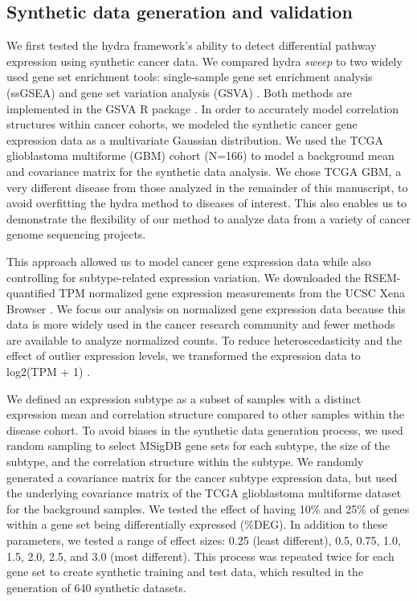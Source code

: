 \documentclass[10pt,letterpaper]{article}
\begin{document}
\subsection*{Synthetic data generation and validation}
We first tested the hydra framework’s ability to detect differential pathway expression using synthetic cancer data. We compared hydra \textit{sweep} to two widely used gene set enrichment tools: single-sample gene set enrichment analysis (ssGSEA) and gene set variation analysis (GSVA) \cite{barbieSystematicRNAInterference2009, hanzelmannGSVAGeneSet2013, tarcaComparisonGeneSet2013}. Both methods are implemented in the GSVA R package \cite{hanzelmannGSVAGeneSet2013}. In order to accurately model correlation structures within cancer cohorts, we modeled the synthetic cancer gene expression data as a multivariate Gaussian distribution. We used the TCGA glioblastoma multiforme (GBM) cohort (N=166) to model a background mean and covariance matrix for the synthetic data analysis. We chose TCGA GBM, a very different disease from those analyzed in the remainder of this manuscript, to avoid overfitting the hydra method to diseases of interest. This also enables us to demonstrate the flexibility of our method to analyze data from a variety of cancer genome sequencing projects.

This approach allowed us to model cancer gene expression data while also controlling for subtype-related expression variation. We downloaded the RSEM-quantified TPM normalized gene expression measurements from the UCSC Xena Browser \cite{goldmanUCSCXenaPlatform2018}. We focus our analysis on normalized gene expression data because this data is more widely used in the cancer research community and fewer methods are available to analyze normalized counts. To reduce heteroscedasticity and the effect of outlier expression levels, we transformed the expression data to log2(TPM + 1) \cite{zwienerTransformingRNASeqData2014}.

We defined an expression subtype as a subset of samples with a distinct expression mean and correlation structure compared to other samples within the disease cohort. To avoid biases in the synthetic data generation process, we used random sampling to select MSigDB gene sets for each subtype, the size of the subtype, and the correlation structure within the subtype. We randomly generated a covariance matrix for the cancer subtype expression data, but used the underlying covariance matrix of the TCGA glioblastoma multiforme dataset for the background samples. We tested the effect of having 10\% and 25\% of genes within a gene set being differentially expressed (\%DEG). In addition to these parameters, we tested a range of effect sizes: 0.25 (least different), 0.5, 0.75, 1.0, 1.5, 2.0, 2.5, and 3.0 (most different). This process was repeated twice for each gene set to create synthetic training and test data, which resulted in the generation of 640 synthetic datasets.
\end{document}
